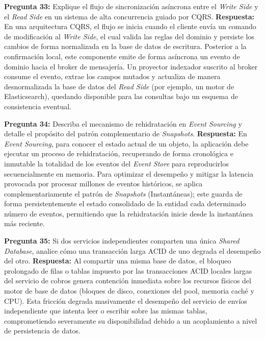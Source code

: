 \vspace{4mm}

\noindent\textbf{Pregunta 33:} Explique el flujo de sincronización asíncrona entre el \textit{Write Side} y el \textit{Read Side} en un sistema de alta concurrencia guiado por CQRS.
\newline
\textbf{Respuesta:} En una arquitectura CQRS, el flujo se inicia cuando el cliente envía un comando de modificación al \textit{Write Side}, el cual valida las reglas del dominio y persiste los cambios de forma normalizada en la base de datos de escritura. Posterior a la confirmación local, este componente emite de forma asíncrona un evento de dominio hacia el broker de mensajería. Un proyector indexador suscrito al broker consume el evento, extrae los campos mutados y actualiza de manera desnormalizada la base de datos del \textit{Read Side} (por ejemplo, un motor de Elasticsearch), quedando disponible para las consultas bajo un esquema de consistencia eventual.

\vspace{4mm}

\noindent\textbf{Pregunta 34:} Describa el mecanismo de rehidratación en \textit{Event Sourcing} y detalle el propósito del patrón complementario de \textit{Snapshots}.
\newline
\textbf{Respuesta:} En \textit{Event Sourcing}, para conocer el estado actual de un objeto, la aplicación debe ejecutar un proceso de rehidratación, recuperando de forma cronológica e inmutable la totalidad de los eventos del \textit{Event Store} para reproducirlos secuencialmente en memoria. Para optimizar el desempeño y mitigar la latencia provocada por procesar millones de eventos históricos, se aplica complementariamente el patrón de \textit{Snapshots} (Instantáneas); este guarda de forma persistentemente el estado consolidado de la entidad cada determinado número de eventos, permitiendo que la rehidratación inicie desde la instantánea más reciente.

\vspace{4mm}

\noindent\textbf{Pregunta 35:} Si dos servicios independientes comparten una única \textit{Shared Database}, analice cómo una transacción larga ACID de uno degrada el desempeño del otro.
\newline
\textbf{Respuesta:} Al compartir una misma base de datos, el bloqueo prolongado de filas o tablas impuesto por las transacciones ACID locales largas del servicio de cobros genera contención inmediata sobre los recursos físicos del motor de base de datos (bloques de disco, conexiones del pool, memoria caché y CPU). Esta fricción degrada masivamente el desempeño del servicio de envíos independiente que intenta leer o escribir sobre las mismas tablas, comprometiendo severamente su disponibilidad debido a un acoplamiento a nivel de persistencia de datos.

